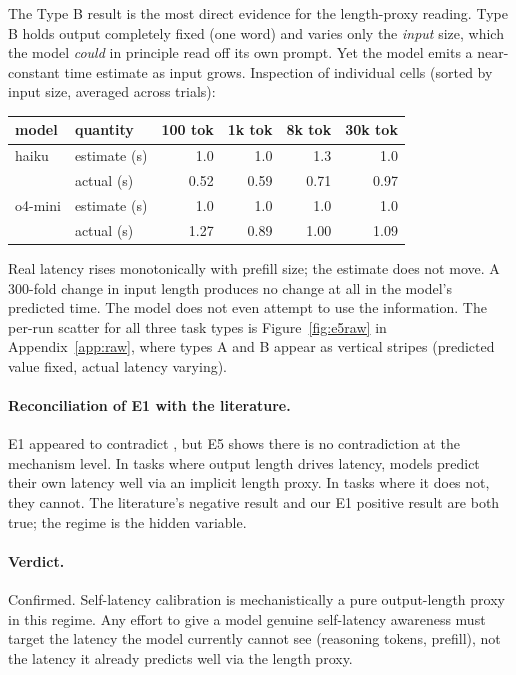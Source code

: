 \documentclass[11pt]{article}
\begin{document}
The Type B result is the most direct evidence for the length-proxy reading. Type B holds
output completely fixed (one word) and varies only the \emph{input} size, which the model
\emph{could} in principle read off its own prompt. Yet the model emits a near-constant time
estimate as input grows. Inspection of individual cells (sorted by input size, averaged across
trials):

\begin{center}
\begin{tabular}{@{}llrrrr@{}}
\toprule
model & quantity & 100 tok & 1k tok & 8k tok & 30k tok \\
\midrule
haiku   & estimate (s) & 1.0 & 1.0 & 1.3 & 1.0 \\
        & actual   (s) & 0.52 & 0.59 & 0.71 & 0.97 \\
o4-mini & estimate (s) & 1.0 & 1.0 & 1.0 & 1.0 \\
        & actual   (s) & 1.27 & 0.89 & 1.00 & 1.09 \\
\bottomrule
\end{tabular}
\end{center}

Real latency rises monotonically with prefill size; the estimate does not move. A 300-fold
change in input length produces no change at all in the model's predicted time. The model
does not even attempt to use the information. The per-run scatter for all three task types is
Figure~\ref{fig:e5raw} in Appendix~\ref{app:raw}, where types A and B appear as vertical
stripes (predicted value fixed, actual latency varying).

\paragraph{Reconciliation of E1 with the literature.} E1 appeared to contradict
\citet{garikaparthi2026time}, but E5 shows there is no contradiction at the mechanism level.
In tasks where output length drives latency, models predict their own latency well via an
implicit length proxy. In tasks where it does not, they cannot. The literature's negative
result \citep{garikaparthi2026time} and our E1 positive result are both true; the regime is
the hidden variable.

\paragraph{Verdict.} Confirmed. Self-latency calibration is mechanistically a pure output-length
proxy in this regime. Any effort to give a model genuine self-latency awareness must target the
latency the model currently cannot see (reasoning tokens, prefill), not the latency it already
predicts well via the length proxy.
\end{document}
